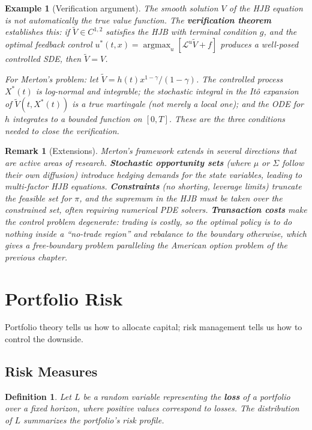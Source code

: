\documentclass{report}
\theoremstyle{spacedplain}
\theoremstyle{spaceddefinition}
\newtheorem{definition}[theorem]{Definition}
\newtheorem{example}[theorem]{Example}
\theoremstyle{spacedremark}
\newtheorem{remark}[theorem]{Remark}
\begin{document}
\begin{example}[Verification argument]
The smooth solution $V$ of the HJB equation is not automatically the true value function. The \textbf{verification theorem} establishes this: if $\tilde{V}
\in C^{1,2}$ satisfies the HJB with terminal condition $g$, and the optimal feedback control $u^*(t,x) = \operatorname{argmax}_u[\mathcal{L}^u \tilde{V} + f]$ produces a well-posed controlled SDE, then $\tilde{V} = V$.
 
For Merton's problem: let $\tilde{V} = h(t)x^{1-\gamma}/(1-\gamma)$. The controlled process $X^*(t)$ is log-normal and integrable; the stochastic integral in the It\^o expansion of $\tilde{V}(t,X^*(t))$ is a true martingale (not merely a local one); and the ODE for $h$ integrates to a bounded
function on $[0,T]$. These are the three conditions needed to close the verification.
\end{example}
 
\begin{remark}[Extensions]
Merton's framework extends in several directions that are active areas of research. \textbf{Stochastic opportunity sets} (where $\mu$ or $\Sigma$ follow their own diffusion) introduce hedging demands for the state variables, leading
to multi-factor HJB equations. \textbf{Constraints} (no shorting, leverage limits) truncate the feasible set for $\pi$, and the supremum in the HJB must be taken over the constrained set, often requiring numerical PDE solvers.
\textbf{Transaction costs} make the control problem degenerate: trading is costly, so the optimal policy is to do nothing inside a ``no-trade region'' and rebalance to the boundary otherwise, which gives a free-boundary problem paralleling the American option problem of the previous chapter.
\end{remark}

\section{Portfolio Risk}

Portfolio theory tells us how to allocate capital; risk management tells us how to control the downside.

\subsection{Risk Measures}

\begin{definition}
Let $L$ be a random variable representing the \textbf{loss} of a portfolio over a fixed horizon, where positive values correspond to losses. The distribution of $L$ summarizes the portfolio's risk profile.
\end{definition}
\end{document}
